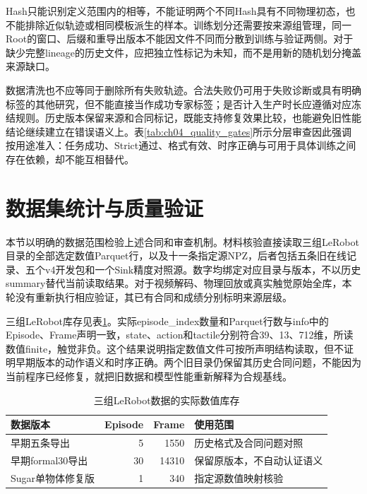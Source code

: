 Hash只能识别定义范围内的相等，不能证明两个不同Hash具有不同物理初态，也不能排除近似轨迹或相同模板派生的样本。训练划分还需要按来源组管理，同一Root的窗口、后缀和重导出版本不能因文件不同而分散到训练与验证两侧。对于缺少完整lineage的历史文件，应把独立性标记为未知，而不是用新的随机划分掩盖来源缺口。

数据清洗也不应等同于删除所有失败轨迹。合法失败仍可用于失败诊断或具有明确标签的其他研究，但不能直接当作成功专家标签；是否计入生产时长应遵循对应冻结规则。历史版本保留来源和合同标记，既能支持修复效果比较，也能避免旧性能结论继续建立在错误语义上。表\ref{tab:ch04_quality_gates}所示分层审查因此强调按用途准入：任务成功、Strict通过、格式有效、时序正确与可用于具体训练之间存在依赖，却不能互相替代。

\section{数据集统计与质量验证}
\label{sec:dataset_quality_validation}

本节以明确的数据范围检验上述合同和审查机制。材料核验直接读取三组LeRobot目录的全部选定数值Parquet行，以及十一条指定源NPZ，后者包括五条旧在线记录、五个v4开发包和一个Sink精度对照源。数字均绑定对应目录与版本，不以历史summary替代当前读取结果。对于视频解码、物理回放或真实触觉原始全库，本轮没有重新执行相应验证，其已有合同和成绩分别标明来源层级。

三组LeRobot库存见表\ref{tab:ch04_lerobot_inventory}。实际episode\_index数量和Parquet行数与info中的Episode、Frame声明一致，state、action和tactile分别符合39、13、712维，所读数值finite，触觉非负。这个结果说明指定数值文件可按所声明结构读取，但不证明早期版本的动作语义和时序正确。两个旧目录仍保留其历史合同问题，不能因为当前程序已经修复，就把旧数据和模型性能重新解释为合规基线。

\begin{table}[htbp]
 \centering\small
 \caption{三组LeRobot数据的实际数值库存}
 \label{tab:ch04_lerobot_inventory}
 \begin{tabular}{p{}rrp{}}
 \hline
 数据版本 & Episode & Frame & 使用范围\\
 \hline
 早期五条导出 & 5 & 1550 & 历史格式及合同问题对照\\
 早期formal30导出 & 30 & 14310 & 保留原版本，不自动认证语义\\
 Sugar单物体修复版 & 1 & 340 & 指定源数值映射核验\\
 \hline
 \end{tabular}
\end{table}

